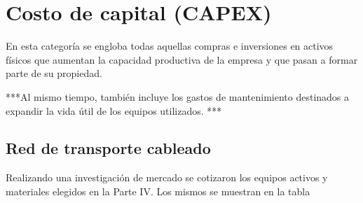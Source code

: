 \documentclass[11pt,a4paper]{article}
\begin{document}
\section{Costo de capital (CAPEX)}

 En esta categoría se engloba todas aquellas compras e inversiones en activos físicos que aumentan la capacidad productiva de la empresa y que pasan a formar parte de su propiedad.

***Al mismo tiempo, también incluye los gastos de mantenimiento destinados a expandir la vida útil de los equipos utilizados. ***

\subsection{Red de transporte cableado}

Realizando una investigación de mercado se cotizaron los equipos activos y materiales elegidos en la Parte IV. Los mismos se muestran en la tabla
\end{document}
